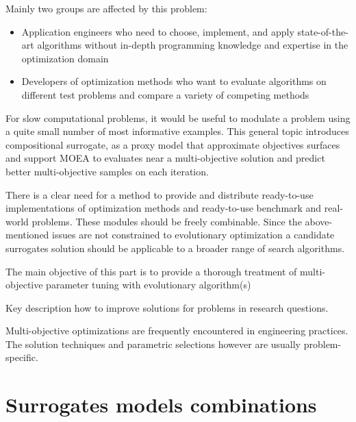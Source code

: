     Mainly two groups are affected by this problem:
    \begin{itemize}
        \item Application engineers who need to choose, implement, and apply state-of-the-art algorithms without in-depth programming knowledge and expertise in the optimization domain
        \item Developers of optimization methods who want to evaluate algorithms on different test problems and compare a variety of competing methods
    \end{itemize}

    For slow computational problems, it would be useful to modulate a problem using a quite small number of most informative examples. This general topic introduces compositional surrogate, as a proxy model that approximate objectives surfaces and support MOEA to evaluates near a multi-objective solution and predict better multi-objective samples on each iteration.


    There is a clear need for a method to provide and distribute ready-to-use implementations of optimization methods and ready-to-use benchmark and real-world problems. 
    These modules should be freely combinable. Since the above- mentioned issues are not constrained to evolutionary optimization a candidate surrogates solution should be applicable to a broader range of search algorithms.

    The main objective of this part is to provide a thorough treatment of multi-objective parameter tuning with evolutionary algorithm(s)

    Key description how to improve solutions for problems in research questions.

    Multi-objective optimizations are frequently encountered in engineering practices. The solution techniques and parametric selections however are usually problem-specific. \cite{abs181207958}


    \section{Surrogates models combinations}
